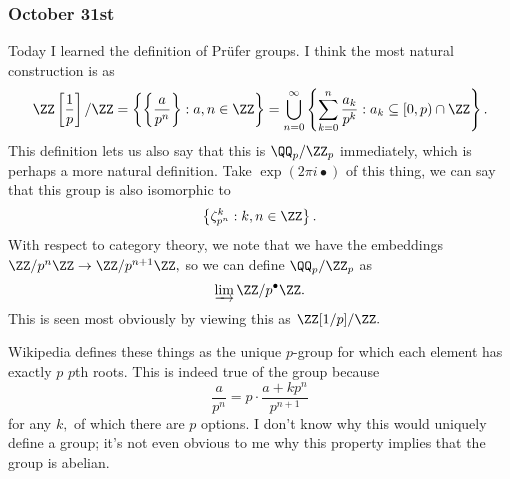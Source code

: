 \subsubsection{October 31st}
Today I learned the definition of Pr\"ufer groups. I think the most natural construction is as
\[\ZZ\left[\frac1p\right]/\ZZ=\left\{\left\{\frac a{p^n}\right\}:a,n\in\ZZ\right\}=\bigcup_{n=0}^\infty\left\{\sum_{k=0}^n\frac{a_k}{p^k}:a_k\subseteq[0,p)\cap\ZZ\right\}.\]
This definition lets us also say that this is $\QQ_p/\ZZ_p$ immediately, which is perhaps a more natural definition. Take $\exp(2\pi i\bullet)$ of this thing, we can say that this group is also isomorphic to
\[\left\{\zeta_{p^n}^k:k,n\in\ZZ\right\}.\]
With respect to category theory, we note that we have the embeddings $\ZZ/p^n\ZZ\to\ZZ/p^{n+1}\ZZ,$ so we can define $\QQ_p/\ZZ_p$ as
\[\varinjlim\ZZ/p^\bullet\ZZ.\]
This is seen most obviously by viewing this as $\ZZ[1/p]/\ZZ.$

Wikipedia defines these things as the unique $p$-group for which each element has exactly $p$ $p$th roots. This is indeed true of the group because
\[\frac a{p^n}=p\cdot\frac{a+kp^n}{p^{n+1}}\]
for any $k,$ of which there are $p$ options. I don't know why this would uniquely define a group; it's not even obvious to me why this property implies that the group is abelian.
